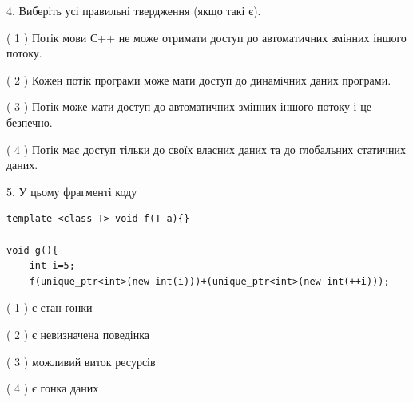 \documentclass[12pt, ukrainian]{article}
\begin{document}
\begin {large}
{%
4. Виберіть усі правильні твердження (якщо такі є).\par
\vspace{2mm}

( 1 ) Потік мови С++ не може отримати доступ до автоматичних змінних іншого потоку.%

( 2 ) Кожен потік програми може мати доступ до динамічних даних програми.%

( 3 ) Потік може мати доступ до автоматичних змінних іншого потоку і це безпечно.%

( 4 ) Потік має доступ тільки до своїх власних даних та до глобальних статичних даних.%


5. У цьому фрагменті коду
\begin{verbatim}
template <class T> void f(T a){}

void g(){
    int i=5;
    f(unique_ptr<int>(new int(i)))+(unique_ptr<int>(new int(++i)));
\end{verbatim}
( 1 ) є стан гонки%

( 2 ) є невизначена поведінка%

( 3 ) можливий виток ресурсів%

( 4 ) є гонка даних%
}
\end {large}
\end{document}
